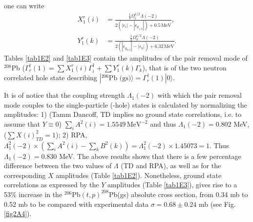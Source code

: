 one can write
\begin{equation*}
\begin{split}
X_1^r(i)&=\frac{\frac{1}{2}\Omega_i^{1/2}\Lambda(-2)}{2(|\epsilon_i|-|\epsilon_{p_{1/2}}|)+0.5\,\text{MeV}},\\ Y_1^r(k)&=\frac{\frac{1}{2}\Omega_k^{1/2}\Lambda(-2)}{2(|\epsilon_{g_{9/2}}|-|\epsilon_k|)+6.32\,\text{MeV}}.
\end{split}
\end{equation*}
Tables \ref{tab1E2} and \ref{tab1E3} contain the amplitudes of the pair removal mode of $^{208}$Pb ($\Gamma^\dagger_r(1)=\sum X^r_{1}(i)\Gamma^\dagger_i+\sum Y^r_{1}(k)\Gamma_k$), that is of the two neutron  correlated hole state describing $|^{206}\text{Pb (gs)}\rangle=\Gamma^\dagger_r(1)|0\rangle$. 


It is of notice that the coupling strength $\Lambda_1 (-2)$ with which the pair removal mode couples to the single-particle (-hole) states is calculated by normalizing the amplitudes: 1) (Tamm Dancoff, TD implies no ground state correlations, i.e. to assume that $Y\equiv0$) $\sum_iA^2(i)=1.5549 \,\text{MeV}^{-2}$ and thus $\Lambda_1 (-2)=0.802$ MeV, ($\sum X(i)^2_{TD}=1$); 2) RPA, $\Lambda_1^2 (-2)\times(\sum_i A^2(i)-\sum_k B^2(k))=\Lambda_1^2(-2)\times1.45073=1$. Thus $\Lambda_1(-2)=0.830$ MeV. The above results shows that there is a few percentage difference between the two values of $\Lambda$ (TD and RPA), as well as for the corresponding $X$ amplitudes (Table \ref{tab1E2}). Nonetheless, ground state correlations as expressed by the $Y$ amplitudes (Table \ref{tab1E3}), gives rise to a 53\% increase in the $^{206}$Pb$(t,p)^{208}$Pb(gs) absolute cross section, from 0.34 mb to 0.52 mb to be compared with experimental data $\sigma=0.68\pm 0.24$ mb (see Fig. \ref{fig2A4}).


